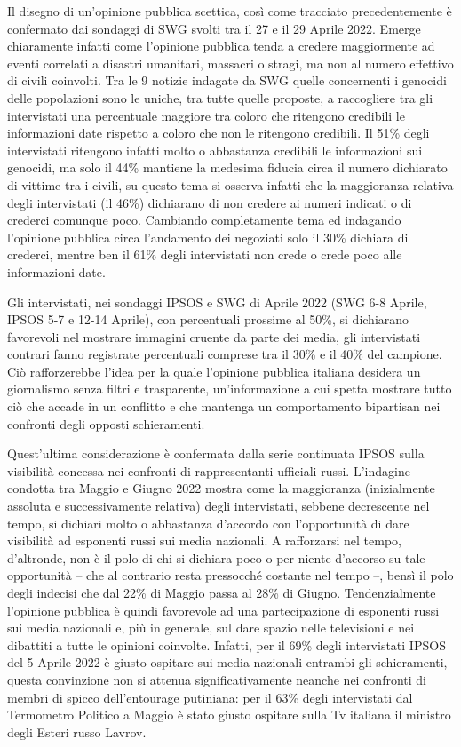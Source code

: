 \documentclass[
  openany]{book}
\begin{document}
Il disegno di un'opinione pubblica scettica, così come tracciato precedentemente è confermato dai sondaggi di SWG svolti tra il 27 e il 29 Aprile 2022. Emerge chiaramente infatti come l'opinione pubblica tenda a credere maggiormente ad eventi correlati a disastri umanitari, massacri o stragi, ma non al numero effettivo di civili coinvolti. Tra le 9 notizie indagate da SWG quelle concernenti i genocidi delle popolazioni sono le uniche, tra tutte quelle proposte, a raccogliere tra gli intervistati una percentuale maggiore tra coloro che ritengono credibili le informazioni date rispetto a coloro che non le ritengono credibili. Il 51\% degli intervistati ritengono infatti molto o abbastanza credibili le informazioni sui genocidi, ma solo il 44\% mantiene la medesima fiducia circa il numero dichiarato di vittime tra i civili, su questo tema si osserva infatti che la maggioranza relativa degli intervistati (il 46\%) dichiarano di non credere ai numeri indicati o di crederci comunque poco. Cambiando completamente tema ed indagando l'opinione pubblica circa l'andamento dei negoziati solo il 30\% dichiara di crederci, mentre ben il 61\% degli intervistati non crede o crede poco alle informazioni date.

Gli intervistati, nei sondaggi IPSOS e SWG di Aprile 2022 (SWG 6-8 Aprile, IPSOS 5-7 e 12-14 Aprile), con percentuali prossime al 50\%, si dichiarano favorevoli nel mostrare immagini cruente da parte dei media, gli intervistati contrari fanno registrate percentuali comprese tra il 30\% e il 40\% del campione. Ciò rafforzerebbe l'idea per la quale l'opinione pubblica italiana desidera un giornalismo senza filtri e trasparente, un'informazione a cui spetta mostrare tutto ciò che accade in un conflitto e che mantenga un comportamento bipartisan nei confronti degli opposti schieramenti.

Quest'ultima considerazione è confermata dalla serie continuata IPSOS sulla visibilità concessa nei confronti di rappresentanti ufficiali russi. L'indagine condotta tra Maggio e Giugno 2022 mostra come la maggioranza (inizialmente assoluta e successivamente relativa) degli intervistati, sebbene decrescente nel tempo, si dichiari molto o abbastanza d'accordo con l'opportunità di dare visibilità ad esponenti russi sui media nazionali. A rafforzarsi nel tempo, d'altronde, non è il polo di chi si dichiara poco o per niente d'accorso su tale opportunità -- che al contrario resta pressocché costante nel tempo --, bensì il polo degli indecisi che dal 22\% di Maggio passa al 28\% di Giugno.
Tendenzialmente l'opinione pubblica è quindi favorevole ad una partecipazione di esponenti russi sui media nazionali e, più in generale, sul dare spazio nelle televisioni e nei dibattiti a tutte le opinioni coinvolte. Infatti, per il 69\% degli intervistati IPSOS del 5 Aprile 2022 è giusto ospitare sui media nazionali entrambi gli schieramenti, questa convinzione non si attenua significativamente neanche nei confronti di membri di spicco dell'entourage putiniana: per il 63\% degli intervistati dal Termometro Politico a Maggio è stato giusto ospitare sulla Tv italiana il ministro degli Esteri russo Lavrov.
\end{document}
